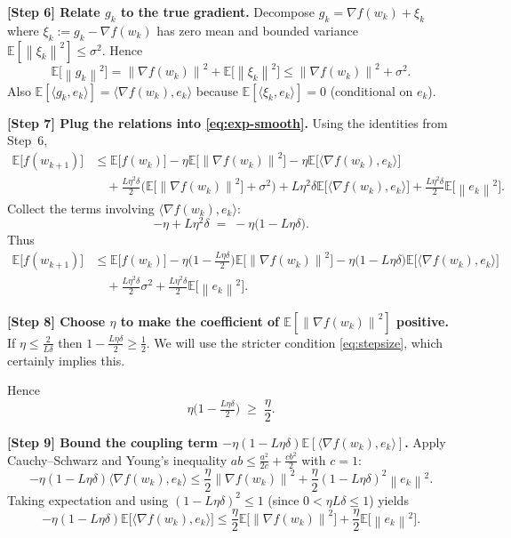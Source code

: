 \documentclass{article}
\newcommand{\E}{\mathbb{E}}
\newcommand{\norm}[1]{\left\|#1\right\|}
\newcommand{\inner}[2]{\langle #1,#2\rangle}
\begin{document}
\noindent\textbf{[Step 6] Relate $g_k$ to the true gradient.}  
Decompose $g_k = \nabla f(w_k) + \xi_k$ where $\xi_k:=g_k-\nabla f(w_k)$ has zero mean and bounded variance $\E[\norm{\xi_k}^2]\le\sigma^2$.
Hence
\[
    \E\!\big[\norm{g_k}^2\big]=\norm{\nabla f(w_k)}^2+\E\!\big[\norm{\xi_k}^2\big]\le
    \norm{\nabla f(w_k)}^2+\sigma^2 .
\]
Also $\E[\inner{g_k}{e_k}]=\inner{\nabla f(w_k)}{e_k}$ because $\E[\inner{\xi_k}{e_k}]=0$ (conditional on $e_k$).

\noindent\textbf{[Step 7] Plug the relations into \eqref{eq:exp-smooth}.}  
Using the identities from Step~6,
\begin{align}
    \E\!\big[f(w_{k+1})\big]
    &\le \E\!\big[f(w_k)\big]
       -\eta\E\!\big[\norm{\nabla f(w_k)}^2\big]
       -\eta\E\!\big[\inner{\nabla f(w_k)}{e_k}\big] \nonumber\\
    &\quad +\frac{L\eta^2\delta}{2}\Big(\E\!\big[\norm{\nabla f(w_k)}^2\big]+\sigma^2\Big)
          +L\eta^2\delta\E\!\big[\inner{\nabla f(w_k)}{e_k}\big]
          +\frac{L\eta^2\delta}{2}\E\!\big[\norm{e_k}^2\big] .
    \label{eq:combined}
\end{align}
Collect the terms involving $\inner{\nabla f(w_k)}{e_k}$:
\[
    -\eta + L\eta^2\delta \;=\; -\eta\big(1-L\eta\delta\big) .
\]
Thus
\begin{align}
    \E\!\big[f(w_{k+1})\big]
    &\le \E\!\big[f(w_k)\big]
       -\eta\!\big(1-\tfrac{L\eta\delta}{2}\big)\E\!\big[\norm{\nabla f(w_k)}^2\big]
       -\eta\big(1-L\eta\delta\big)\E\!\big[\inner{\nabla f(w_k)}{e_k}\big] \nonumber\\
    &\quad +\frac{L\eta^2\delta}{2}\sigma^2
       +\frac{L\eta^2\delta}{2}\E\!\big[\norm{e_k}^2\big] .
    \label{eq:pre-error}
\end{align}

\noindent\textbf{[Step 8] Choose $\eta$ to make the coefficient of $\E[\norm{\nabla f(w_k)}^2]$ positive.}  
If $\eta\le \frac{2}{L\delta}$ then $1-\frac{L\eta\delta}{2}\ge\frac12$.  
We will use the stricter condition \eqref{eq:stepsize}, which certainly implies this.

Hence
\begin{equation}
    \eta\!\big(1-\tfrac{L\eta\delta}{2}\big) \;\ge\; \frac{\eta}{2}.
    \label{eq:coeff-grad}
\end{equation}

\noindent\textbf{[Step 9] Bound the coupling term $-\eta(1-L\eta\delta)\E[\inner{\nabla f(w_k)}{e_k}]$.}  
Apply Cauchy–Schwarz and Young’s inequality $ab\le \frac{a^2}{2c}+ \frac{c b^2}{2}$ with $c=1$:
\[
    -\eta(1-L\eta\delta)\inner{\nabla f(w_k)}{e_k}
    \le \frac{\eta}{2}\norm{\nabla f(w_k)}^2
        +\frac{\eta}{2}(1-L\eta\delta)^2\norm{e_k}^2 .
\]
Taking expectation and using $(1-L\eta\delta)^2\le 1$ (since $0<\eta L\delta\le 1$) yields
\begin{equation}
    -\eta(1-L\eta\delta)\E\!\big[\inner{\nabla f(w_k)}{e_k}\big]
    \le \frac{\eta}{2}\E\!\big[\norm{\nabla f(w_k)}^2\big]
        +\frac{\eta}{2}\E\!\big[\norm{e_k}^2\big] .
    \label{eq:young}
\end{equation}
\end{document}

